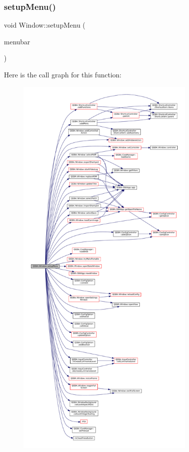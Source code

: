 \subsubsection{\texorpdfstring{setup\+Menu()}{setupMenu()}}
{\footnotesize\ttfamily void Window\+::setup\+Menu (\begin{DoxyParamCaption}\item[{Q\+Menu\+Bar $\ast$}]{menubar }\end{DoxyParamCaption})\hspace{0.3cm}{\ttfamily [private]}}

Here is the call graph for this function\+:
\nopagebreak
\begin{figure}[H]
\begin{center}
\leavevmode
\includegraphics[height=550pt]{class_q_g_b_a_1_1_window_a529d32e64893056a7307db1ccfd10df9_cgraph}
\end{center}
\end{figure}
